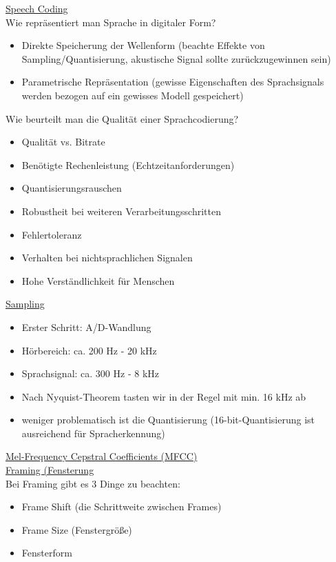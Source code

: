 \documentclass[a4paper,10pt,oneside]{article}
\begin{document}
\underline{Speech Coding} \\
Wie repräsentiert man Sprache in digitaler Form?
	\begin{itemize}
		\item Direkte Speicherung der Wellenform (beachte Effekte von Sampling/Quantisierung, akustische Signal sollte zurückzugewinnen sein)
		\item Parametrische Repräsentation (gewisse Eigenschaften des Sprachsignals werden bezogen auf ein gewisses Modell gespeichert)
	\end{itemize}

Wie beurteilt man die Qualität einer Sprachcodierung?
	\begin{itemize}
		\item Qualität vs. Bitrate
		\item Benötigte Rechenleistung (Echtzeitanforderungen)
		\item Quantisierungsrauschen
		\item Robustheit bei weiteren Verarbeitungsschritten
		\item Fehlertoleranz
		\item Verhalten bei nichtsprachlichen Signalen
		\item Hohe Verständlichkeit für Menschen
	\end{itemize}
	
\underline{Sampling} \\
	\begin{itemize}
		\item Erster Schritt: A/D-Wandlung
		\item Hörbereich: ca. 200 Hz - 20 kHz
		\item Sprachsignal: ca. 300 Hz - 8 kHz
		\item Nach Nyquist-Theorem tasten wir in der Regel mit min. 16 kHz ab
		\item weniger problematisch ist die Quantisierung (16-bit-Quantisierung ist ausreichend für Spracherkennung)
	\end{itemize}
	
\underline{Mel-Frequency Cepstral Coefficients (MFCC)} \\
\underline{Framing (Fensterung} \\
Bei Framing gibt es 3 Dinge zu beachten:
	\begin{itemize}
		\item Frame Shift (die Schrittweite zwischen Frames)
		\item Frame Size (Fenstergröße)
		\item Fensterform
	\end{itemize}
\end{document}
